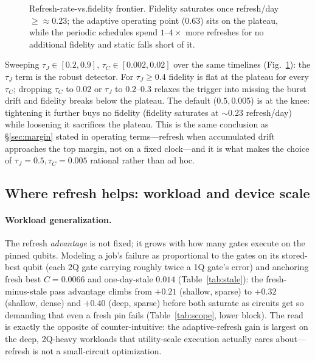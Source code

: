 \documentclass[journal,10pt,twocolumn]{IEEEtran}
\begin{document}
\begin{figure}[t]
\centering
{}
\caption{Refresh-rate-vs.\-fidelity frontier. Fidelity saturates once refresh/day $\ge{\approx}0.23$; the adaptive
operating point ($0.63$) sits on the plateau, while the periodic schedules spend $1$--$4\times$ more refreshes for
no additional fidelity and static falls short of it.}
\label{fig:parc}
\end{figure}

Sweeping $\tau_J{\in}[0.2,0.9]$, $\tau_C{\in}[0.002,0.02]$ over the same timelines (Fig.~\ref{fig:parc}):
the $\tau_J$ term is the robust detector. For $\tau_J\ge0.4$ fidelity is flat at the plateau for every $\tau_C$;
dropping $\tau_C$ to $0.02$ or $\tau_J$ to $0.2$--$0.3$ relaxes the trigger into missing the burst drift and
fidelity breaks below the plateau. The default ($0.5,0.005$) is at the knee: tightening it further buys no
fidelity (fidelity saturates at $\sim0.23$ refresh/day) while loosening it sacrifices the plateau. This is the
same conclusion as \S\ref{sec:margin} stated in operating terms---refresh when accumulated drift approaches the
top margin, not on a fixed clock---and it is what makes the choice of $\tau_J{=}0.5,\tau_C{=}0.005$ rational
rather than ad hoc.

\subsection{Where refresh helps: workload and device scale}
\label{sec:scope}
\paragraph{Workload generalization.}
The refresh \emph{advantage} is not fixed; it grows with how many gates execute on the pinned qubits. Modeling a
job's failure as proportional to the gates on its stored-best qubit (each 2Q gate carrying roughly twice a 1Q
gate's error) and anchoring fresh best $C{=}0.0066$ and one-day-stale $0.014$ (Table~\ref{tab:stale}):
the fresh-minus-stale pass advantage climbs from $+0.21$ (shallow, sparse) to $+0.32$ (shallow, dense) and
$+0.40$ (deep, sparse) before both saturate as circuits get so demanding that even a fresh pin fails
(Table~\ref{tab:scope}, lower block). The read is exactly the opposite of counter-intuitive: the adaptive-refresh
gain is largest on the deep, 2Q-heavy workloads that utility-scale execution actually cares about---refresh is not
a small-circuit optimization.
\end{document}
